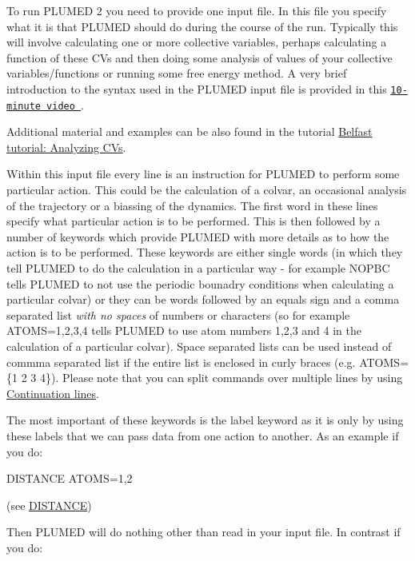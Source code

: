 To run P\+L\+U\+M\+E\+D 2 you need to provide one input file. In this file you specify what it is that P\+L\+U\+M\+E\+D should do during the course of the run. Typically this will involve calculating one or more collective variables, perhaps calculating a function of these C\+Vs and then doing some analysis of values of your collective variables/functions or running some free energy method. A very brief introduction to the syntax used in the P\+L\+U\+M\+E\+D input file is provided in this \href{http://www.youtube.com/watch?v=PxJP16qNCYs}{\tt 10-\/minute video }.

Additional material and examples can be also found in the tutorial \hyperlink{belfast-1}{Belfast tutorial\+: Analyzing C\+Vs}.

Within this input file every line is an instruction for P\+L\+U\+M\+E\+D to perform some particular action. This could be the calculation of a colvar, an occasional analysis of the trajectory or a biassing of the dynamics. The first word in these lines specify what particular action is to be performed. This is then followed by a number of keywords which provide P\+L\+U\+M\+E\+D with more details as to how the action is to be performed. These keywords are either single words (in which they tell P\+L\+U\+M\+E\+D to do the calculation in a particular way -\/ for example N\+O\+P\+B\+C tells P\+L\+U\+M\+E\+D to not use the periodic bounadry conditions when calculating a particular colvar) or they can be words followed by an equals sign and a comma separated list {\itshape with no spaces} of numbers or characters (so for example A\+T\+O\+M\+S=1,2,3,4 tells P\+L\+U\+M\+E\+D to use atom numbers 1,2,3 and 4 in the calculation of a particular colvar). Space separated lists can be used instead of commma separated list if the entire list is enclosed in curly braces (e.\+g. A\+T\+O\+M\+S=\{1 2 3 4\}). Please note that you can split commands over multiple lines by using \hyperlink{ContinuationLines}{Continuation lines}.

The most important of these keywords is the label keyword as it is only by using these labels that we can pass data from one action to another. As an example if you do\+:

\begin{DoxyVerb}DISTANCE ATOMS=1,2
\end{DoxyVerb}
 (see \hyperlink{DISTANCE}{D\+I\+S\+T\+A\+N\+C\+E})

Then P\+L\+U\+M\+E\+D will do nothing other than read in your input file. In contrast if you do\+:


